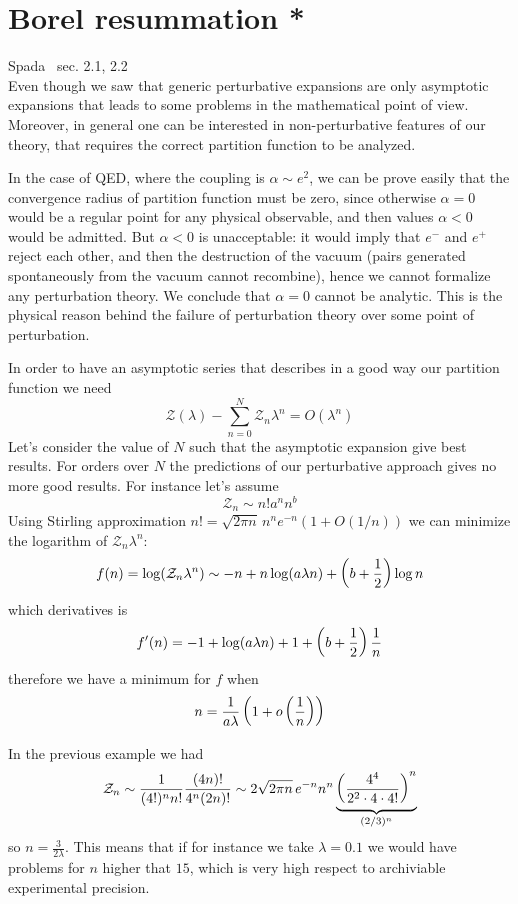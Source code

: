 \documentclass[../main/main.tex]{subfiles}
\begin{document}
\section{Borel resummation *}

\textsf{Spada~\cite{Spada:2018aa} sec. 2.1, 2.2}\\

Even though we saw that generic perturbative expansions are only asymptotic expansions that leads to some problems in the mathematical point of view. Moreover, in general one can be interested in non-perturbative features of our theory, that requires the correct partition function to be analyzed. 

In the case of QED, where the coupling is $\alpha\sim e^2$, we can be prove easily that the convergence radius of partition function must be zero, since otherwise $\alpha=0$ would be a regular point for any physical observable, and then values $\alpha<0$ would be admitted. But $\alpha<0$ is unacceptable: it would imply that $e^-$ and $e^+$  reject each other, and then the destruction of the vacuum (pairs generated spontaneously from the vacuum cannot recombine), hence we cannot formalize any perturbation theory. We conclude that $\alpha=0$ cannot be analytic. This is the physical reason behind the failure of perturbation theory over some point of perturbation.  

In order to have an asymptotic series that describes in a good way our partition function we need
\[\mathcal Z(\lambda)-\sum_{n=0}^N\mathcal Z_n\lambda^n
=O(\lambda^n)\]
Let's consider the value of $N$ such that the asymptotic expansion give best results. For orders over $N$ the predictions of our perturbative approach gives no more good results. For instance let's assume
\[\mathcal Z_n\sim n!a^nn^b\]
Using Stirling approximation $n!=\sqrt{2\pi n}\,n^ne^{-n}(1+O(1/n))$ we can minimize the logarithm of $\mathcal Z_n\lambda^n$:
\[f(n)=\log(\mathcal Z_n\lambda^n)\sim-n+n\log(a\lambda n)+\left(b+\frac12\right)\log n\]
which derivatives is
\[f'(n)=-1+\log(a\lambda n)+1+\left(b+\frac12\right)\frac1n\]
therefore we have a minimum for $f$ when
\[n=\frac1{a\lambda}\left(1+o\left(\frac1n\right)\right)\]

In the previous example we had
\[\mathcal Z_n\sim \frac1{(4!)^nn!}\frac{(4n)!}{4^n(2n)!}\sim{2}{\sqrt{2\pi n}}\,e^{-n}n^n\underbrace{\left(\frac{4^4}{2^2\cdot4\cdot4!}\right)^n}_{(2/3)^n}\]
so $n=\frac3{2\lambda}$. This means that if for instance we take $\lambda=0.1$ we would have problems for $n$ higher that $15$, which is very high respect to archiviable experimental precision.  
\end{document}
